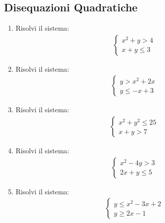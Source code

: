 \documentclass[letterpaper,10pt,italian]{jupyterBook}
\begin{document}
\subsection{Disequazioni Quadratiche}
\label{\detokenize{ch/algebra/real-n-algebra:disequazioni-quadratiche}}\begin{enumerate}
%
\item {} 
\sphinxAtStartPar
Risolvi il sistema:
\begin{equation*}
\begin{split}
    \begin{cases}
    x^2 + y > 4 \\
    x + y \leq 3
    \end{cases}
    \end{split}
\end{equation*}
\item {} 
\sphinxAtStartPar
Risolvi il sistema:
\begin{equation*}
\begin{split}
    \begin{cases}
    y > x^2 + 2x \\
    y \leq -x + 3
    \end{cases}
    \end{split}
\end{equation*}
\item {} 
\sphinxAtStartPar
Risolvi il sistema:
\begin{equation*}
\begin{split}
    \begin{cases}
    x^2 + y^2 \leq 25 \\
    x + y > 7
    \end{cases}
    \end{split}
\end{equation*}
\item {} 
\sphinxAtStartPar
Risolvi il sistema:
\begin{equation*}
\begin{split}
    \begin{cases}
    x^2 - 4y > 3 \\
    2x + y \leq 5
    \end{cases}
    \end{split}
\end{equation*}
\item {} 
\sphinxAtStartPar
Risolvi il sistema:
\begin{equation*}
\begin{split}
    \begin{cases}
    y \leq x^2 - 3x + 2 \\
    y \geq 2x - 1
    \end{cases}
   \end{split}
\end{equation*}
\end{enumerate}
\end{document}
